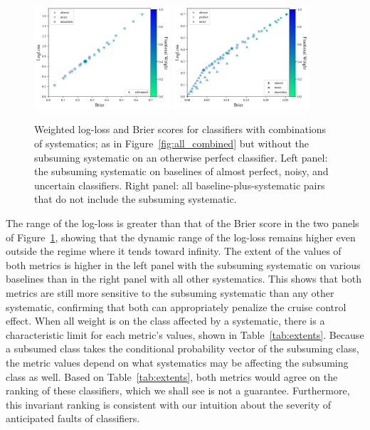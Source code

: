 \begin{figure}
	\begin{center}
		\includegraphics[width=0.45\textwidth]{./fig/middle_zoom.png}
		\includegraphics[width=0.45\textwidth]{./fig/lower_zoom.png}
		\caption{Weighted log-loss and Brier scores for classifiers with combinations of systematics; as in Figure~\ref{fig:all_combined} but without the subsuming systematic on an otherwise perfect classifier.
		Left panel: the subsuming systematic on baselines of almost perfect, noisy, and uncertain classifiers.
		Right panel: all baseline-plus-systematic pairs that do not include the subsuming systematic.
		}
	\end{center}
	\label{fig:subsume}
\end{figure}

The range of the log-loss is greater than that of the Brier score in the two panels of Figure~\ref{fig:subsume}, showing that the dynamic range of the log-loss remains higher even outside the regime where it tends toward infinity.
The extent of the values of both metrics is higher in the left panel with the subsuming systematic on various baselines than in the right panel with all other systematics.
This shows that both metrics are still more sensitive to the subsuming systematic than any other systematic, confirming that both can appropriately penalize the cruise control effect.
When all weight is on the class affected by a systematic, there is a characteristic limit for each metric's values, shown in Table~\ref{tab:extents}.
Because a subsumed class takes the conditional probability vector of the subsuming class, the metric values depend on what systematics may be affecting the subsuming class as well.
Based on Table~\ref{tab:extents}, both metrics would agree on the ranking of these classifiers, which we shall see is not a guarantee.
Furthermore, this invariant ranking is consistent with our intuition about the severity of anticipated faults of classifiers.

